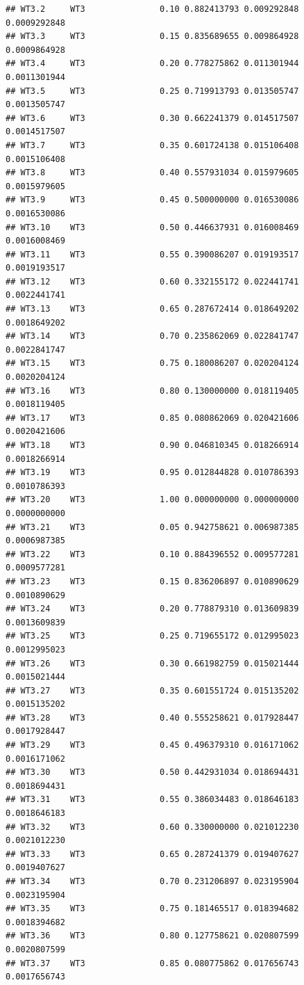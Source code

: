 \documentclass[
]{book}
\begin{document}
\begin{verbatim}
## WT3.2     WT3               0.10 0.882413793 0.009292848 0.0009292848
## WT3.3     WT3               0.15 0.835689655 0.009864928 0.0009864928
## WT3.4     WT3               0.20 0.778275862 0.011301944 0.0011301944
## WT3.5     WT3               0.25 0.719913793 0.013505747 0.0013505747
## WT3.6     WT3               0.30 0.662241379 0.014517507 0.0014517507
## WT3.7     WT3               0.35 0.601724138 0.015106408 0.0015106408
## WT3.8     WT3               0.40 0.557931034 0.015979605 0.0015979605
## WT3.9     WT3               0.45 0.500000000 0.016530086 0.0016530086
## WT3.10    WT3               0.50 0.446637931 0.016008469 0.0016008469
## WT3.11    WT3               0.55 0.390086207 0.019193517 0.0019193517
## WT3.12    WT3               0.60 0.332155172 0.022441741 0.0022441741
## WT3.13    WT3               0.65 0.287672414 0.018649202 0.0018649202
## WT3.14    WT3               0.70 0.235862069 0.022841747 0.0022841747
## WT3.15    WT3               0.75 0.180086207 0.020204124 0.0020204124
## WT3.16    WT3               0.80 0.130000000 0.018119405 0.0018119405
## WT3.17    WT3               0.85 0.080862069 0.020421606 0.0020421606
## WT3.18    WT3               0.90 0.046810345 0.018266914 0.0018266914
## WT3.19    WT3               0.95 0.012844828 0.010786393 0.0010786393
## WT3.20    WT3               1.00 0.000000000 0.000000000 0.0000000000
## WT3.21    WT3               0.05 0.942758621 0.006987385 0.0006987385
## WT3.22    WT3               0.10 0.884396552 0.009577281 0.0009577281
## WT3.23    WT3               0.15 0.836206897 0.010890629 0.0010890629
## WT3.24    WT3               0.20 0.778879310 0.013609839 0.0013609839
## WT3.25    WT3               0.25 0.719655172 0.012995023 0.0012995023
## WT3.26    WT3               0.30 0.661982759 0.015021444 0.0015021444
## WT3.27    WT3               0.35 0.601551724 0.015135202 0.0015135202
## WT3.28    WT3               0.40 0.555258621 0.017928447 0.0017928447
## WT3.29    WT3               0.45 0.496379310 0.016171062 0.0016171062
## WT3.30    WT3               0.50 0.442931034 0.018694431 0.0018694431
## WT3.31    WT3               0.55 0.386034483 0.018646183 0.0018646183
## WT3.32    WT3               0.60 0.330000000 0.021012230 0.0021012230
## WT3.33    WT3               0.65 0.287241379 0.019407627 0.0019407627
## WT3.34    WT3               0.70 0.231206897 0.023195904 0.0023195904
## WT3.35    WT3               0.75 0.181465517 0.018394682 0.0018394682
## WT3.36    WT3               0.80 0.127758621 0.020807599 0.0020807599
## WT3.37    WT3               0.85 0.080775862 0.017656743 0.0017656743

\end{verbatim}
\end{document}
